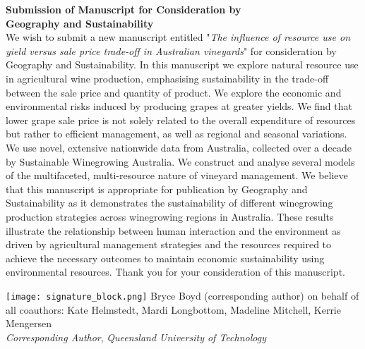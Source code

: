 \documentclass{article}
\begin{document}
\centering \textbf{Submission of Manuscript for Consideration by \\Geography and Sustainability}\\
\bigskip %
\justifying
\newline \noindent
We wish to submit a new manuscript entitled "\textit{The influence of resource use on yield versus sale price trade-off in Australian vineyards}" for consideration by Geography and Sustainability.
\newline \noindent
In this manuscript we explore natural resource use in agricultural wine production, emphasising sustainability in the trade-off between the sale price and quantity of product. We explore the economic and environmental risks induced by producing grapes at greater yields. We find that lower grape sale price is not solely related to the overall expenditure of resources but rather to efficient management, as well as regional and seasonal variations. We use novel, extensive nationwide data from Australia, collected over a decade by Sustainable Winegrowing Australia. We construct and analyse several models of the multifaceted, multi-resource nature of vineyard management. 
\newline \noindent
We believe that this manuscript is appropriate for publication by Geography and Sustainability as it demonstrates the sustainability of different winegrowing production strategies across winegrowing regions in Australia. These results illustrate the relationship between human interaction and the environment as driven by agricultural management strategies and the resources required to achieve the necessary outcomes to maintain economic sustainability using environmental resources. Thank you for your consideration of this manuscript.
\bigskip \noindent%

\texttt{[image: signature\_block.png]}
\newline \noindent
Bryce Boyd (corresponding author) on behalf of all coauthors: Kate Helmstedt, Mardi Longbottom, Madeline Mitchell, Kerrie Mengersen\\
\newline \noindent
\textit{Corresponding Author}, \textit{Queensland University of Technology}
\end{document}
